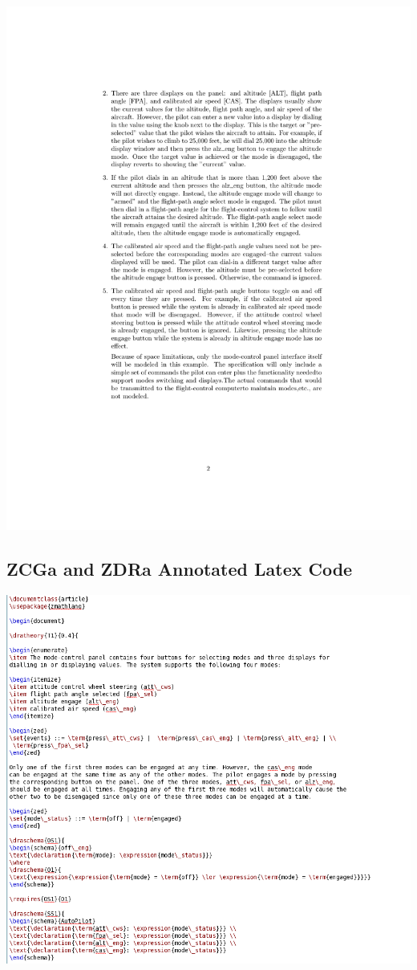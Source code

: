 \noindent \includegraphics[clip, trim=4cm 4cm 4cm 4.2cm, scale=0.9]{examples/semiform/0comp2.pdf}
%
\subsection{ZCGa and ZDRa Annotated Latex Code}
\includegraphics[scale=0.5]{examples/semiform/1n2a.png}

